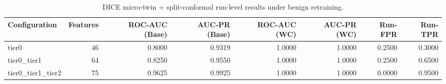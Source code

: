 \begin{table}[t]
\centering
\caption{DICE micro-twin + split-conformal run-level results under benign retraining.}
\label{tab:dice_full_overall}
\footnotesize
\begin{tabular}{lrrrrrrr}
\toprule
Configuration & Features & ROC-AUC (Base) & AUC-PR (Base) & ROC-AUC (WC) & AUC-PR (WC) & Run-FPR & Run-TPR \\
\midrule
tier0 & 46 & 0.8000 & 0.9319 & 1.0000 & 1.0000 & 0.2500 & 0.3000 \\
tier0_tier1 & 64 & 0.8250 & 0.9550 & 1.0000 & 1.0000 & 0.2500 & 0.6500 \\
tier0_tier1_tier2 & 75 & 0.9625 & 0.9925 & 1.0000 & 1.0000 & 0.0000 & 0.9500 \\
\bottomrule
\end{tabular}

\end{table}
